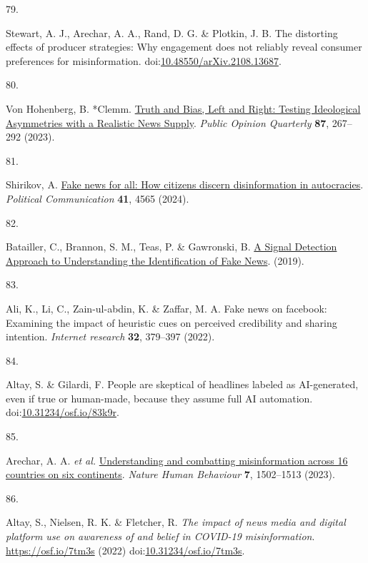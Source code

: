 \documentclass[
  doc,floatsintext]{apa6}
\newlength{\cslhangindent}
\newlength{\csllabelwidth}
\newenvironment{CSLReferences}[2] %
 {\begin{list}{}{%
  \setlength{\itemindent}{0pt}
  \setlength{\leftmargin}{0pt}
  \setlength{\parsep}{0pt}
  \ifodd #1
   \setlength{\leftmargin}{\cslhangindent}
   \setlength{\itemindent}{-1\cslhangindent}
  \fi
  \setlength{\itemsep}{#2\baselineskip}}}
 {\end{list}}
\newcommand{\CSLLeftMargin}[1]{\parbox[t]{\csllabelwidth}{\strut#1\strut}}
\newcommand{\CSLRightInline}[1]{\parbox[t]{\linewidth - \csllabelwidth}{\strut#1\strut}}
\begin{document}
\begin{CSLReferences}{0}{0}
\CSLLeftMargin{79. }%
\CSLRightInline{Stewart, A. J., Arechar, A. A., Rand, D. G. \& Plotkin, J. B. The distorting effects of producer strategies: Why engagement does not reliably reveal consumer preferences for misinformation. doi:\href{https://doi.org/10.48550/arXiv.2108.13687}{10.48550/arXiv.2108.13687}.}

\CSLLeftMargin{80. }%
\CSLRightInline{Von Hohenberg, B. *Clemm. \href{https://doi.org/10.1093/poq/nfad013}{Truth and Bias, Left and Right: Testing Ideological Asymmetries with a Realistic News Supply}. \emph{Public Opinion Quarterly} \textbf{87}, 267--292 (2023).}

\CSLLeftMargin{81. }%
\CSLRightInline{*Shirikov, A. \href{https://doi.org/10.1080/10584609.2023.2257618}{Fake news for all: How citizens discern disinformation in autocracies}. \emph{Political Communication} \textbf{41}, 4565 (2024).}

\CSLLeftMargin{82. }%
\CSLRightInline{Batailler, C., Brannon, S. M., Teas, P. \& Gawronski, B. \href{https://osf.io/uc9me/}{A Signal Detection Approach to Understanding the Identification of Fake News}. (2019).}

\CSLLeftMargin{83. }%
\CSLRightInline{*Ali, K., Li, C., Zain-ul-abdin, K. \& Zaffar, M. A. Fake news on facebook: Examining the impact of heuristic cues on perceived credibility and sharing intention. \emph{Internet research} \textbf{32}, 379--397 (2022).}

\CSLLeftMargin{84. }%
\CSLRightInline{*Altay, S. \& Gilardi, F. People are skeptical of headlines labeled as AI-generated, even if true or human-made, because they assume full AI automation. doi:\href{https://doi.org/10.31234/osf.io/83k9r}{10.31234/osf.io/83k9r}.}

\CSLLeftMargin{85. }%
\CSLRightInline{*Arechar, A. A. \emph{et al.} \href{https://doi.org/10.1038/s41562-023-01641-6}{Understanding and combatting misinformation across 16 countries on six continents}. \emph{Nature Human Behaviour} \textbf{7}, 1502--1513 (2023).}

\CSLLeftMargin{86. }%
\CSLRightInline{*Altay, S., Nielsen, R. K. \& Fletcher, R. \emph{The impact of news media and digital platform use on awareness of and belief in COVID-19 misinformation}. \url{https://osf.io/7tm3s} (2022) doi:\href{https://doi.org/10.31234/osf.io/7tm3s}{10.31234/osf.io/7tm3s}.}


\end{CSLReferences}
\end{document}
